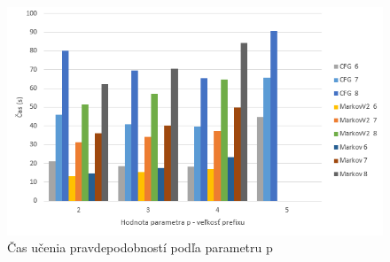 \begin{figure}[ht]
    \centering
    \includegraphics[width=1\textwidth]{prepareTime}
    \caption{Čas učenia pravdepodobností podľa parametru p}
    \label{fig:prepareTime}
\end{figure}

